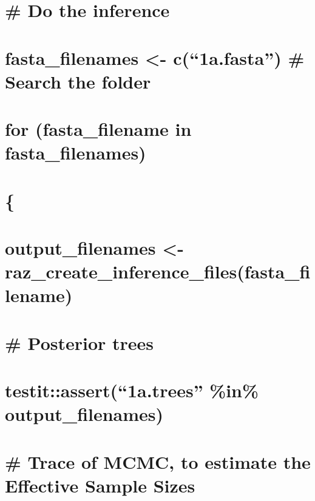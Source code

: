 \documentclass[]{article}
\begin{document}
\section{}\label{section-2}

\section{\# Do the inference}\label{do-the-inference}

\section{\texorpdfstring{fasta\_filenames \textless{}- c(``1a.fasta'')
\# Search the
folder}{fasta\_filenames \textless{}- c(1a.fasta) \# Search the folder}}\label{fasta_filenames---c1a.fasta-search-the-folder}

\section{for (fasta\_filename in
fasta\_filenames)}\label{for-fasta_filename-in-fasta_filenames}

\section{\{}\label{section-3}

\section{output\_filenames \textless{}-
raz\_create\_inference\_files(fasta\_filename)}\label{output_filenames---raz_create_inference_filesfasta_filename}

\section{\# Posterior trees}\label{posterior-trees}

\section{\texorpdfstring{testit::assert(``1a.trees'' \%in\%
output\_filenames)}{testit::assert(1a.trees \%in\% output\_filenames)}}\label{testitassert1a.trees-in-output_filenames}

\section{\# Trace of MCMC, to estimate the Effective Sample
Sizes}\label{trace-of-mcmc-to-estimate-the-effective-sample-sizes}
\end{document}
